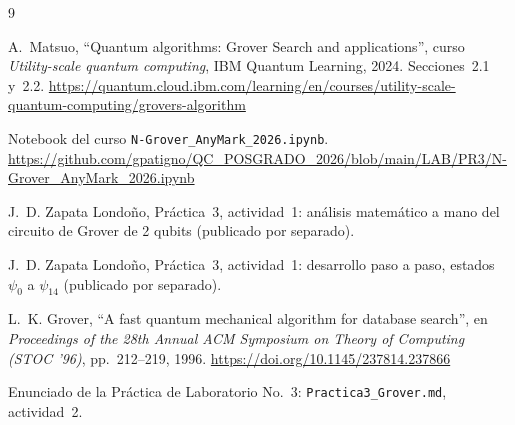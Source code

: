 \documentclass[11pt,a4paper]{article}
\begin{document}
\begin{thebibliography}{9}

A.~Matsuo, ``Quantum algorithms: Grover Search and applications'', curso \emph{Utility-scale quantum
computing}, IBM Quantum Learning, 2024. Secciones~2.1 y~2.2.
\url{https://quantum.cloud.ibm.com/learning/en/courses/utility-scale-quantum-computing/grovers-algorithm}

Notebook del curso \texttt{N-Grover\_AnyMark\_2026.ipynb}.
\url{https://github.com/gpatigno/QC_POSGRADO_2026/blob/main/LAB/PR3/N-Grover_AnyMark_2026.ipynb}

J.~D. Zapata Londoño, Práctica~3, actividad~1: análisis matemático a mano del circuito de Grover de 2 qubits (publicado por separado).

J.~D. Zapata Londoño, Práctica~3, actividad~1: desarrollo paso a paso, estados $\psi_0$ a $\psi_{14}$ (publicado por separado).

L.~K. Grover, ``A fast quantum mechanical algorithm for database search'', en \emph{Proceedings of
the 28th Annual ACM Symposium on Theory of Computing (STOC '96)}, pp.~212--219, 1996.
\url{https://doi.org/10.1145/237814.237866}

Enunciado de la Práctica de Laboratorio No.~3: \texttt{Practica3\_Grover.md}, actividad~2.

\end{thebibliography}
\end{document}
